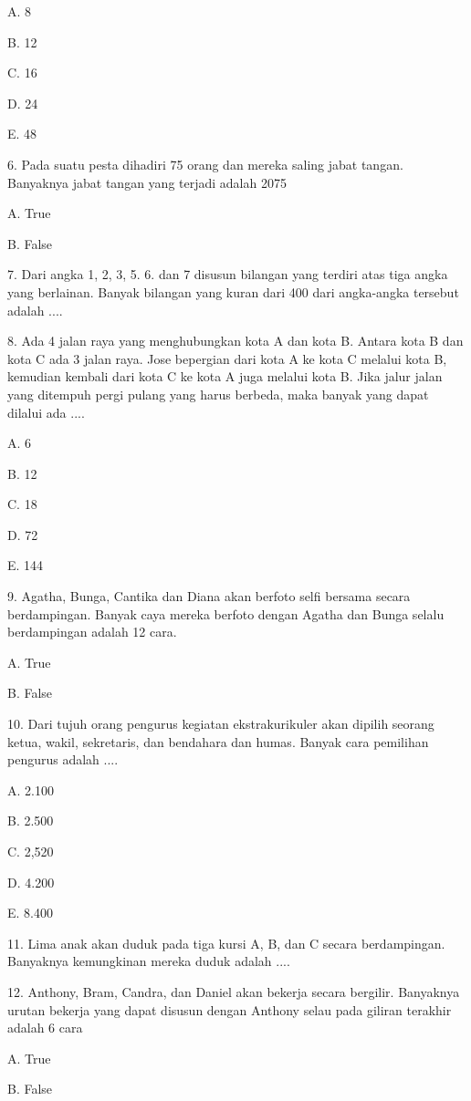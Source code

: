 \documentclass[11pt,fleqn]{book} %
\begin{document}
A. 
8

B. 
12

C. 
16

D. 
24

E. 
48

6. 
Pada suatu pesta dihadiri 75 orang dan mereka saling jabat tangan. Banyaknya jabat tangan yang terjadi adalah 2075

A. 
True

B. 
False

7. 
Dari angka 1, 2, 3, 5. 6. dan 7 disusun bilangan yang terdiri atas tiga angka yang berlainan. Banyak bilangan yang kuran dari 400 dari angka-angka tersebut adalah ....

8. 
Ada 4 jalan raya yang menghubungkan kota A dan kota B. Antara kota B dan kota C ada 3 jalan raya. Jose bepergian dari kota A ke kota C melalui kota B, kemudian kembali dari kota C ke kota A juga melalui kota B. Jika jalur jalan yang ditempuh pergi pulang yang harus berbeda, maka banyak yang dapat dilalui ada ....

A. 
6

B. 
12

C. 
18

D. 
72

E. 
144

9. 
Agatha, Bunga, Cantika dan Diana akan berfoto selfi bersama secara berdampingan. Banyak caya mereka berfoto dengan Agatha dan Bunga selalu berdampingan adalah 12 cara.

A. 
True

B. 
False

10. 
Dari tujuh orang pengurus kegiatan ekstrakurikuler akan dipilih seorang ketua, wakil, sekretaris, dan bendahara dan humas. Banyak cara pemilihan pengurus adalah ....

A. 
2.100

B. 
2.500

C. 
2,520

D. 
4.200

E. 
8.400

11. 
Lima anak akan duduk pada tiga kursi A, B, dan C secara berdampingan. Banyaknya kemungkinan mereka duduk adalah 
....

12. 
Anthony, Bram, Candra, dan Daniel akan bekerja secara bergilir. Banyaknya urutan bekerja yang dapat disusun dengan Anthony selau pada giliran terakhir adalah 6 cara

A. 
True

B. 
False
\end{document}
